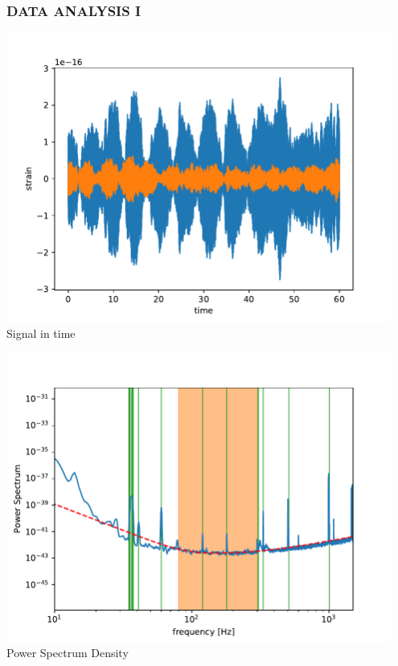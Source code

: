 \documentclass[handout]{beamer}
\begin{document}
\begin{frame}
	\frametitle{DATA ANALYSIS I}
	\bigskip
    \begin{minipage}{0.45\textwidth}
			\centering

				\includegraphics[width=0.95\textwidth]{h1} \
\scriptsize
				Signal in time
\end{minipage}
\hfill
\begin{minipage}{0.45\textwidth}
			\centering
				\includegraphics[width=0.95\textwidth]{psd} \
\scriptsize
				Power Spectrum Density
	\end{minipage}\\
	\smallskip
    \centering


\end{frame}
\end{document}
